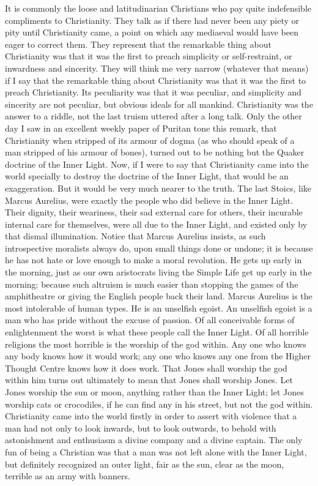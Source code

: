 It is commonly the loose and latitudinarian Christians who pay quite indefensible compliments to Christianity. They talk as if there had never been any piety or pity until Christianity came, a point on which any mediaeval would have been eager to correct them. They represent that the remarkable thing about Christianity was that it was the first to preach simplicity or self-restraint, or inwardness and sincerity. They will think me very narrow (whatever that means) if I say that the remarkable thing about Christianity was that it was the first to preach Christianity. Its peculiarity was that it was peculiar, and simplicity and sincerity are not peculiar, but obvious ideals for all mankind. Christianity was the answer to a riddle, not the last truism uttered after a long talk. Only the other day I saw in an excellent weekly paper of Puritan tone this remark, that Christianity when stripped of its armour of dogma (as who should speak of a man stripped of his armour of bones), turned out to be nothing but the Quaker doctrine of the Inner Light. Now, if I were to say that Christianity came into the world specially to destroy the doctrine of the Inner Light, that would be an exaggeration. But it would be very much nearer to the truth. The last Stoics, like Marcus Aurelius, were exactly the people who did believe in the Inner Light. Their dignity, their weariness, their sad external care for others, their incurable internal care for themselves, were all due to the Inner Light, and existed only by that dismal illumination. Notice that Marcus Aurelius insists, as such introspective moralists always do, upon small things done or undone; it is because he has not hate or love enough to make a moral revolution. He gets up early in the morning, just as our own aristocrats living the Simple Life get up early in the morning; because such altruism is much easier than stopping the games of the amphitheatre or giving the English people back their land. Marcus Aurelius is the most intolerable of human types. He is an unselfish egoist. An unselfish egoist is a man who has pride without the excuse of passion. Of all conceivable forms of enlightenment the worst is what these people call the Inner Light. Of all horrible religions the most horrible is the worship of the god within. Any one who knows any body knows how it would work; any one who knows any one from the Higher Thought Centre knows how it does work. That Jones shall worship the god within him turns out ultimately to mean that Jones shall worship Jones. Let Jones worship the sun or moon, anything rather than the Inner Light; let Jones worship cats or crocodiles, if he can find any in his street, but not the god within. Christianity came into the world firstly in order to assert with violence that a man had not only to look inwards, but to look outwards, to behold with astonishment and enthusiasm a divine company and a divine captain. The only fun of being a Christian was that a man was not left alone with the Inner Light, but definitely recognized an outer light, fair as the sun, clear as the moon, terrible as an army with banners.

